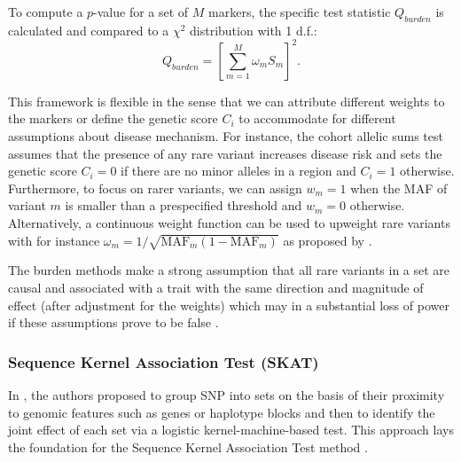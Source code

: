\documentclass[]{book}
\begin{document}
To compute a \(\textit{p}\)-value for a set of \(M\) markers, the specific
test statistic \(Q_{burden}\) is calculated and compared to a \(\chi^2\)
distribution with 1 d.f.:
\[Q_{burden} = \left[ \sum_{m=1}^M \omega_m S_m \right]^2.\]

This framework is flexible in the sense that we can attribute different
weights to the markers or define the genetic score \(C_i\) to accommodate
for different assumptions about disease mechanism. For instance, the
cohort allelic sums test \citep[CAST,][]{morgenthaler2007strategy} assumes that
the presence of any rare variant increases disease risk and sets the
genetic score \(C_i = 0\) if there are no minor alleles in a region and
\(C_i = 1\) otherwise. Furthermore, to focus on rarer variants, we can
assign \(w_m = 1\) when the MAF of variant \(m\) is smaller than a
prespecified threshold and \(w_m = 0\) otherwise. Alternatively, a
continuous weight function can be used to upweight rare variants with
for instance \(\omega_m = 1 / \sqrt{\text{MAF}_m (1 - \text{MAF}_m)}\) as
proposed by \citep{madsen2009groupwise}.

The burden methods make a strong assumption that all rare variants in a
set are causal and associated with a trait with the same direction and
magnitude of effect (after adjustment for the weights) which may in a
substantial loss of power if these assumptions prove to be false
\citep{lee_rare-variant_2014}.

\hypertarget{sequence-kernel-association-test-skat}{%
\subsubsection*{Sequence Kernel Association Test (SKAT)}\label{sequence-kernel-association-test-skat}}

In \citep{wu_powerful_2010}, the authors proposed to group SNP into sets on
the basis of their proximity to genomic features such as genes or
haplotype blocks and then to identify the joint effect of each set via a
logistic kernel-machine-based test. This approach lays the foundation
for the Sequence Kernel Association Test method \citep[SKAT,][]{wu_rare-variant_2011}.
\end{document}
